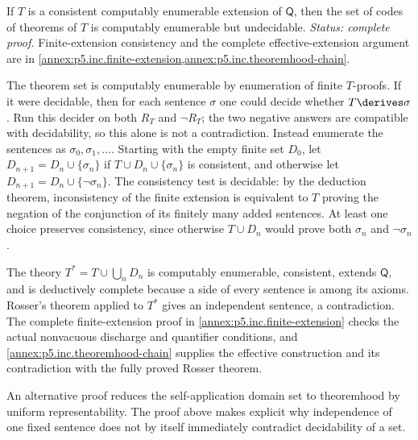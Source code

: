 \begin{corollary}
If \(T\) is a consistent computably enumerable extension of \(\mathsf Q\),
then the set of codes of theorems of \(T\) is computably enumerable but
undecidable.
\textit{Status: complete proof.}  Finite-extension consistency and
the complete effective-extension argument are in
\cref{annex:p5.inc.finite-extension,annex:p5.inc.theoremhood-chain}.
\end{corollary}

\begin{proofplan}
The theorem set is computably enumerable by enumeration of finite \(T\)-proofs.  If it were
decidable, then for each sentence \(\sigma\) one could decide whether
\(T\derives\sigma\).  Run this decider on both \(R_T\) and \(\neg R_T\); the
two negative answers are compatible with decidability, so this alone is not a
contradiction.  Instead enumerate the sentences as
\(\sigma_0,\sigma_1,\ldots\).  Starting with the empty finite set \(D_0\), let
\(D_{n+1}=D_n\cup\{\sigma_n\}\) if \(T\cup D_n\cup\{\sigma_n\}\) is
consistent, and otherwise let
\(D_{n+1}=D_n\cup\{\neg\sigma_n\}\).  The consistency test is decidable:
by the deduction theorem, inconsistency of the finite extension is equivalent
to \(T\) proving the negation of the conjunction of its finitely many added
sentences.  At least one choice preserves consistency, since otherwise
\(T\cup D_n\) would prove both \(\sigma_n\) and \(\neg\sigma_n\).

The theory \(T^*=T\cup\bigcup_nD_n\) is computably enumerable, consistent, extends
\(\mathsf Q\), and is deductively complete because a side of every sentence
is among its axioms.  Rosser's theorem applied to \(T^*\) gives an independent
sentence, a contradiction.
The complete finite-extension proof in
\cref{annex:p5.inc.finite-extension} checks the actual nonvacuous
discharge and quantifier conditions, and
\cref{annex:p5.inc.theoremhood-chain} supplies the effective construction
and its contradiction with the fully proved Rosser theorem.
\end{proofplan}

\begin{remark}
An alternative proof reduces the self-application domain set to theoremhood by uniform
representability.  The proof above makes explicit why independence of one
fixed sentence does not by itself immediately contradict decidability of a
set.
\end{remark}
